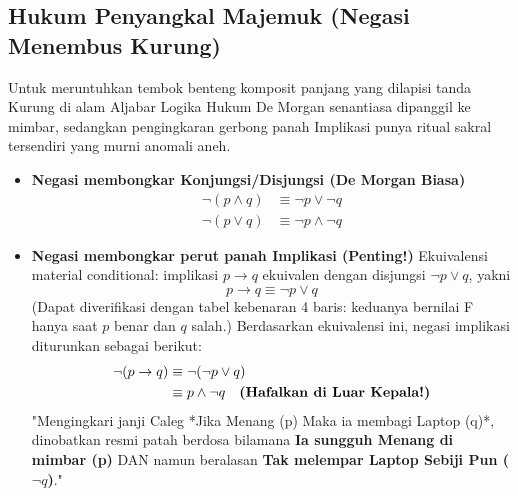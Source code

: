 \subsection{Hukum Penyangkal Majemuk (Negasi Menembus Kurung)}

Untuk meruntuhkan tembok benteng komposit panjang yang dilapisi tanda Kurung di alam Aljabar Logika Hukum De Morgan senantiasa dipanggil ke mimbar, sedangkan pengingkaran gerbong panah Implikasi punya ritual sakral tersendiri yang murni anomali aneh.

\begin{itemize}
    \item \textbf{Negasi membongkar Konjungsi/Disjungsi (De Morgan Biasa)}
    \begin{align*}
        \neg(p \wedge q) &\equiv \neg p \vee \neg q \\
        \neg(p \vee q) &\equiv \neg p \wedge \neg q
    \end{align*}
    
    \item \textbf{Negasi membongkar perut panah Implikasi (Penting!)}
    Ekuivalensi material conditional: implikasi $p \rightarrow q$ ekuivalen dengan disjungsi $\neg p \vee q$, yakni
    \begin{equation*}
        p \rightarrow q \equiv \neg p \vee q
    \end{equation*}
    (Dapat diverifikasi dengan tabel kebenaran 4 baris: keduanya bernilai F hanya saat $p$ benar dan $q$ salah.) Berdasarkan ekuivalensi ini, negasi implikasi diturunkan sebagai berikut:
    \begin{align*}
        \neg(p \rightarrow q) &\equiv \neg(\neg p \vee q) \\
                              &\equiv p \wedge \neg q \quad \text{\textbf{(Hafalkan di Luar Kepala!)}}
    \end{align*}
    "Mengingkari janji Caleg *Jika Menang (p) Maka ia membagi Laptop (q)*, dinobatkan resmi patah berdosa bilamana \textbf{Ia sungguh Menang di mimbar (p)} DAN namun beralasan \textbf{Tak melempar Laptop Sebiji Pun ($\neg q$)}."
\end{itemize}

